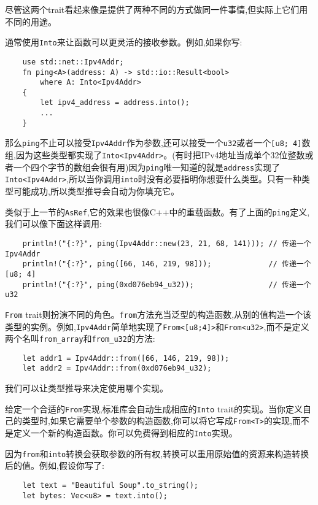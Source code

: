尽管这两个trait看起来像是提供了两种不同的方式做同一件事情,但实际上它们用不同的用途。

通常使用\texttt{Into}来让函数可以更灵活的接收参数。例如,如果你写:
\begin{verbatim}
    use std::net::Ipv4Addr;
    fn ping<A>(address: A) -> std::io::Result<bool>
        where A: Into<Ipv4Addr>
    {
        let ipv4_address = address.into();
        ...
    }
\end{verbatim}

那么\texttt{ping}不止可以接受\texttt{Ipv4Addr}作为参数,还可以接受一个\texttt{u32}或者一个\texttt{[u8; 4]}数组,因为这些类型都实现了\texttt{Into<Ipv4Addr>}。(有时把IPv4地址当成单个32位整数或者一个四个字节的数组会很有用)因为\texttt{ping}唯一知道的就是\texttt{address}实现了\texttt{Into<Ipv4Addr>},所以当你调用\texttt{into}时没有必要指明你想要什么类型。只有一种类型可能成功,所以类型推导会自动为你填充它。

类似于上一节的\texttt{AsRef},它的效果也很像C++中的重载函数。有了上面的\texttt{ping}定义,我们可以像下面这样调用:
\begin{verbatim}
    println!("{:?}", ping(Ipv4Addr::new(23, 21, 68, 141))); // 传递一个Ipv4Addr
    println!("{:?}", ping([66, 146, 219, 98]));             // 传递一个[u8; 4]
    println!("{:?}", ping(0xd076eb94_u32));                 // 传递一个u32
\end{verbatim}

\texttt{From} trait则扮演不同的角色。\texttt{from}方法充当泛型的构造函数,从别的值构造一个该类型的实例。例如,\texttt{Ipv4Addr}简单地实现了\texttt{From<[u8;4]>}和\texttt{From<u32>},而不是定义两个名叫\texttt{from\_array}和\texttt{from\_u32}的方法:
\begin{verbatim}
    let addr1 = Ipv4Addr::from([66, 146, 219, 98]);
    let addr2 = Ipv4Addr::from(0xd076eb94_u32);
\end{verbatim}

我们可以让类型推导来决定使用哪个实现。

给定一个合适的\texttt{From}实现,标准库会自动生成相应的\texttt{Into} trait的实现。当你定义自己的类型时,如果它需要单个参数的构造函数,你可以将它写成\texttt{From<T>}的实现,而不是定义一个新的构造函数。你可以免费得到相应的\texttt{Into}实现。

因为\texttt{from}和\texttt{into}转换会获取参数的所有权,转换可以重用原始值的资源来构造转换后的值。例如,假设你写了:
\begin{verbatim}
    let text = "Beautiful Soup".to_string();
    let bytes: Vec<u8> = text.into();
\end{verbatim}

